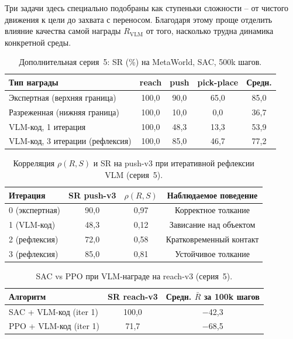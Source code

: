     Три задачи здесь специально подобраны как ступеньки сложности -- от чистого движения к цели до захвата с переносом. Благодаря этому проще отделить влияние качества самой награды $R_{\text{VLM}}$ от того, насколько трудна динамика конкретной среды.

\begin{table}[htbp]
\caption{Дополнительная серия~5: SR (\%) на MetaWorld, SAC, 500k шагов.}
\label{tab:vlm_metaworld}
\centering
\footnotesize
\setlength{\tabcolsep}{5pt}
\renewcommand{\arraystretch}{1.15}
\begin{tabularx}{\textwidth}{@{}>{\raggedright\arraybackslash}Xcccc@{}}
\toprule
\textbf{Тип награды} & \textbf{reach} & \textbf{push} & \textbf{pick-place} & \textbf{Средн.} \\
\midrule
Экспертная (верхняя граница)     & 100{,}0 & 90{,}0 & 65{,}0 & 85{,}0 \\
Разреженная (нижняя граница)     & 100{,}0 & 10{,}0 & 0{,}0  & 36{,}7 \\
VLM-код, 1 итерация              & 100{,}0 & 48{,}3 & 13{,}3 & 53{,}9 \\
VLM-код, 3 итерации (рефлексия)  & 100{,}0 & 85{,}0 & 46{,}7 & 77{,}2 \\
\bottomrule
\end{tabularx}
\end{table}

\begin{table}[htbp]
\caption{Корреляция $\rho(R, S)$ и SR на push-v3 при итеративной рефлексии VLM (серия~5).}
\label{tab:vlm_rho}
\centering
\footnotesize
\begin{tabular}{@{}lccc@{}}
\toprule
\textbf{Итерация} & \textbf{SR push-v3} & \textbf{$\rho(R, S)$} & \textbf{Наблюдаемое поведение} \\
\midrule
0 (экспертная)     & 90{,}0 & 0{,}97 & Корректное толкание \\
1 (VLM-код)        & 48{,}3 & 0{,}12 & Зависание над объектом \\
2 (рефлексия)      & 72{,}0 & 0{,}58 & Кратковременный контакт \\
3 (рефлексия)      & 85{,}0 & 0{,}81 & Устойчивое толкание \\
\bottomrule
\end{tabular}
\end{table}

\begin{table}[htbp]
\caption{SAC vs PPO при VLM-награде на reach-v3 (серия~5).}
\label{tab:vlm_sac_ppo}
\centering
\footnotesize
\begin{tabular}{@{}lcc@{}}
\toprule
\textbf{Алгоритм} & \textbf{SR reach-v3} & \textbf{Средн. $\bar{R}$ за 100k шагов} \\
\midrule
SAC + VLM-код (iter 1) & 100{,}0 & $-$42{,}3 \\
PPO + VLM-код (iter 1) & 71{,}7  & $-$68{,}5 \\
\bottomrule
\end{tabular}
\end{table}

